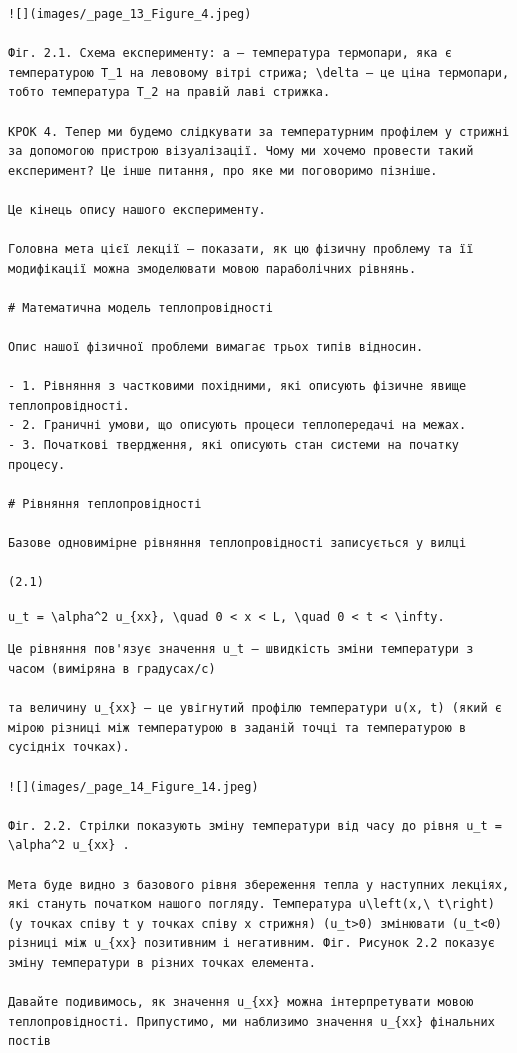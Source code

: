 \documentclass[
  ukrainian,
]{article}
\begin{document}
\begin{verbatim}
![](images/_page_13_Figure_4.jpeg)

Фіг. 2.1. Схема експерименту: a – температура термопари, яка є температурою T_1 на левовому вітрі стрижа; \delta — це ціна термопари, тобто температура T_2 на правій лаві стрижка.

КРОК 4. Тепер ми будемо слідкувати за температурним профілем у стрижні за допомогою пристрою візуалізації. Чому ми хочемо провести такий експеримент? Це інше питання, про яке ми поговоримо пізніше.

Це кінець опису нашого експерименту.

Головна мета цієї лекції — показати, як цю фізичну проблему та її модифікації можна змоделювати мовою параболічних рівнянь.

# Математична модель теплопровідності

Опис нашої фізичної проблеми вимагає трьох типів відносин.

- 1. Рівняння з частковими похідними, які описують фізичне явище теплопровідності.
- 2. Граничні умови, що описують процеси теплопередачі на межах.
- 3. Початкові твердження, які описують стан системи на початку процесу.

# Рівняння теплопровідності

Базове одновимірне рівняння теплопровідності записується у вилці

(2.1)
\end{verbatim}

\texttt{u\_t\ =\ \textbackslash{}alpha\^{}2\ u\_\{xx\},\ \textbackslash{}quad\ 0\ \textless{}\ x\ \textless{}\ L,\ \textbackslash{}quad\ 0\ \textless{}\ t\ \textless{}\ \textbackslash{}infty.}

\begin{verbatim}
Це рівняння пов'язує значення u_t — швидкість зміни температури з часом (виміряна в градусах/с)

та величину u_{xx} — це увігнутий профілю температури u(x, t) (який є мірою різниці між температурою в заданій точці та температурою в сусідніх точках).

![](images/_page_14_Figure_14.jpeg)

Фіг. 2.2. Стрілки показують зміну температури від часу до рівня u_t = \alpha^2 u_{xx} .

Мета буде видно з базового рівня збереження тепла у наступних лекціях, які стануть початком нашого погляду. Температура u\left(x,\ t\right) (у точках співу t у точках співу x стрижня) (u_t>0) змінювати (u_t<0) різниці між u_{xx} позитивним і негативним. Фіг. Рисунок 2.2 показує зміну температури в різних точках елемента.

Давайте подивимось, як значення u_{xx} можна інтерпретувати мовою теплопровідності. Припустимо, ми наблизимо значення u_{xx} фінальних постів
\end{verbatim}
\end{document}
